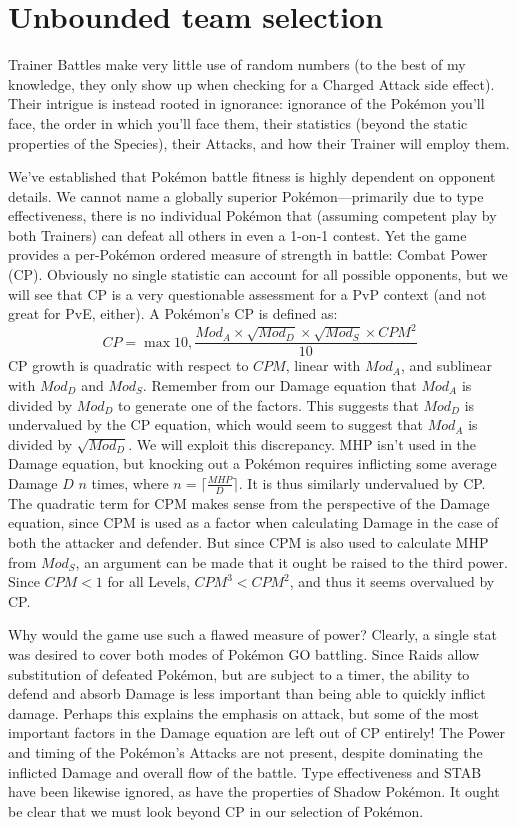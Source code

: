 \chapter{Unbounded team selection}
\label{chap:unbounded}
Trainer Battles make very little use of random numbers (to the best of my
 knowledge, they only show up when checking for a Charged Attack side
 effect).
Their intrigue is instead rooted in ignorance: ignorance of
 the Pokémon you'll face, the order in which you'll face them,
 their statistics (beyond the static properties of the Species),
 their Attacks, and how their Trainer will employ them.

We've established that Pokémon battle fitness is highly dependent
 on opponent details.
We cannot name a globally superior Pokémon---primarily due to type effectiveness,
 there is no individual Pokémon that (assuming competent play by both Trainers)
 can defeat all others in even a 1-on-1 contest.
Yet the game provides a per-Pokémon ordered measure of strength in battle: Combat Power (CP).
Obviously no single statistic can account for all possible opponents, but
 we will see that CP is a very questionable assessment for a PvP
 context (and not great for PvE, either).
A Pokémon's CP is defined as:
\[ CP = \max{10, \frac{Mod_A \times \sqrt{Mod_D} \times \sqrt{Mod_S} \times CPM^2}{10}} \]
CP growth is quadratic with respect to $CPM$, linear with $Mod_A$, and
  sublinear with $Mod_D$ and $Mod_S$.
Remember from our Damage equation that $Mod_A$ is divided by $Mod_D$
 to generate one of the factors.
This suggests that $Mod_D$ is undervalued by the CP equation, which
 would seem to suggest that $Mod_A$ is divided by $\sqrt{Mod_D}$.
We will exploit this discrepancy.
MHP isn't used in the Damage equation, but knocking out a Pokémon
 requires inflicting some average Damage $D$ $n$ times,
 where $n = \lceil\frac{MHP}{D}\rceil$.
It is thus similarly undervalued by CP\@.
The quadratic term for CPM makes sense from the perspective of the Damage
 equation, since CPM is used as a factor when calculating Damage in the
 case of both the attacker and defender.
But since CPM is also used to calculate MHP from $Mod_S$, an argument
 can be made that it ought be raised to the third power.
Since $CPM < 1$ for all Levels, $CPM^3 < CPM^2$, and thus it seems
 overvalued by CP\@.

Why would the game use such a flawed measure of power?
Clearly, a single stat was desired to cover both modes of Pokémon GO battling.
Since Raids allow substitution of defeated Pokémon, but are subject to a timer,
  the ability to defend and absorb Damage is less important than being able to
  quickly inflict damage.
Perhaps this explains the emphasis on attack, but some of the most important
  factors in the Damage equation are left out of CP entirely!
The Power and timing of the Pokémon's Attacks are not present, despite
  dominating the inflicted Damage and overall flow of the battle.
Type effectiveness and STAB have been likewise ignored, as have the
  properties of Shadow Pokémon.
It ought be clear that we must look beyond CP in our selection of Pokémon.

